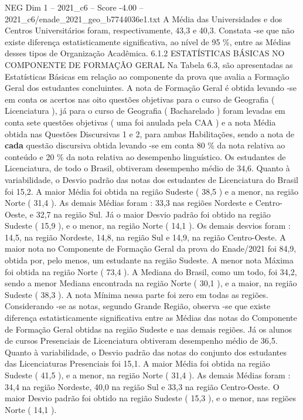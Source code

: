\begin{textsample}{NEG Dim 1 – 2021\_c6 – Score -4.00 – 2021\_c6/enade\_2021\_geo\_b7744036e1.txt}
A Média das Universidades e dos Centros Universitários foram, respectivamente, 43,3 e 40,3.
Constata -se que não existe diferença estatisticamente significativa, ao nível de 95 \%, entre as Médias desses tipos de Organização Acadêmica. 6.1.2 ESTATÍSTICAS BÁSICAS NO COMPONENTE DE FORMAÇÃO GERAL Na Tabela 6.3, são apresentadas as Estatísticas Básicas em relação ao componente da prova que avalia a Formação Geral dos estudantes concluintes.
A nota de Formação Geral é obtida levando -se em conta os acertos nas oito questões objetivas para o curso de Geografia ( Licenciatura ), já para o curso de Geografia ( Bacharelado ) foram levadas em conta sete questões objetivas ( uma foi anulada pela CAA ) e a nota Média obtida nas Questões Discursivas 1 e 2, para ambas Habilitações, sendo a nota de \textbf{cada} questão discursiva obtida levando -se em conta 80 \% da nota relativa ao conteúdo e 20 \% da nota relativa ao desempenho linguístico.
Os estudantes de Licenciatura, de todo o Brasil, obtiveram desempenho médio de 34,6.
Quanto à variabilidade, o Desvio padrão das notas dos estudantes de Licenciatura do Brasil foi 15,2.
A maior Média foi obtida na região Sudeste ( 38,5 ) e a menor, na região Norte ( 31,4 ).
As demais Médias foram : 33,3 nas regiões Nordeste e Centro-Oeste, e 32,7 na região Sul.
Já o maior Desvio padrão foi obtido na região Sudeste ( 15,9 ), e o menor, na região Norte ( 14,1 ).
Os demais desvios foram : 14,5, na região Nordeste, 14,8, na região Sul e 14,9, na região Centro-Oeste.
A maior nota no Componente de Formação Geral da prova do Enade/2021 foi 84,9, obtida por, pelo menos, um estudante na região Sudeste.
A menor nota Máxima foi obtida na região Norte ( 73,4 ).
A Mediana do Brasil, como um todo, foi 34,2, sendo a menor Mediana encontrada na região Norte ( 30,1 ), e a maior, na região Sudeste ( 38,3 ).
A nota Mínima nessa parte foi zero em todas as regiões.
Considerando -se as notas, segundo Grande Região, observa -se que existe diferença estatisticamente significativa entre as Médias das notas do Componente de Formação Geral obtidas na região Sudeste e nas demais regiões.
Já os alunos de cursos Presenciais de Licenciatura obtiveram desempenho médio de 36,5.
Quanto à variabilidade, o Desvio padrão das notas do conjunto dos estudantes das Licenciaturas Presenciais foi 15,1.
A maior Média foi obtida na região Sudeste ( 41,5 ), e a menor, na região Norte ( 31,4 ).
As demais Médias foram : 34,4 na região Nordeste, 40,0 na região Sul e 33,3 na região Centro-Oeste.
O maior Desvio padrão foi obtido na região Sudeste ( 15,3 ), e o menor, nas regiões Norte ( 14,1 ).

\end{textsample}
